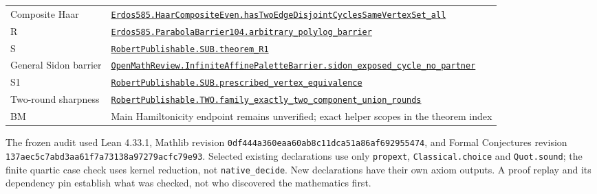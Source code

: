 \documentclass[smallextended]{svjour3}
\begin{document}
{\begin{longtable}[]{@{}
  >{\raggedright\arraybackslash}p{}
  >{\raggedright\arraybackslash}p{}@{}}
Composite Haar &
\href{https://github.com/alejandrozu/openmath-2026-judging/blob/70c5ec3107658182f22c207d4c50f53f9cb3e602/robert-review-2026-10-07/lean/Openmath/Proofs/HaarCompositeEven.lean\#L441}{\texttt{Erdos585.HaarCompositeEven.hasTwoEdgeDisjointCyclesSameVertexSet\_all}} \\
R &
\href{https://github.com/alejandrozu/openmath-2026-judging/blob/70c5ec3107658182f22c207d4c50f53f9cb3e602/robert-review-2026-10-07/lean/Openmath/Proofs/ParabolaBarrier104.lean\#L145}{\texttt{Erdos585.ParabolaBarrier104.arbitrary\_polylog\_barrier}} \\
S &
\href{https://github.com/alejandrozu/openmath-2026-judging/blob/70c5ec3107658182f22c207d4c50f53f9cb3e602/robert-review-2026-10-07/lean/R1.lean\#L13}{\texttt{RobertPublishable.SUB.theorem\_R1}} \\
General Sidon barrier &
\href{https://github.com/alejandrozu/openmath-2026-judging/blob/70c5ec3107658182f22c207d4c50f53f9cb3e602/robert-review-2026-10-07/lean/InfiniteAffinePaletteBarrier.lean\#L54}{\texttt{OpenMathReview.InfiniteAffinePaletteBarrier.sidon\_exposed\_cycle\_no\_partner}} \\
S1 &
\href{https://github.com/alejandrozu/openmath-2026-judging/blob/70c5ec3107658182f22c207d4c50f53f9cb3e602/robert-review-2026-10-07/lean/PrescribedVertex.lean\#L89}{\texttt{RobertPublishable.SUB.prescribed\_vertex\_equivalence}} \\
Two-round sharpness &
\href{https://github.com/alejandrozu/openmath-2026-judging/blob/70c5ec3107658182f22c207d4c50f53f9cb3e602/robert-review-2026-10-07/lean/CycleComposition.lean\#L171}{\texttt{RobertPublishable.TWO.family\_exactly\_two\_component\_union\_rounds}} \\
BM & Main Hamiltonicity endpoint remains unverified; exact helper scopes
in the theorem index \\
\end{longtable}
}

The frozen audit used Lean 4.33.1, Mathlib revision
\texttt{0df444a360eaa60ab8c11dca51a86af692955474}, and Formal
Conjectures revision \texttt{137aec5c7abd3aa61f7a73138a97279acfc79e93}.
Selected existing declarations use only \texttt{propext},
\texttt{Classical.choice} and \texttt{Quot.sound}; the finite quartic
case check uses kernel reduction, not \texttt{native\_decide}. New
declarations have their own axiom outputs. A proof replay and its
dependency pin establish what was checked, not who discovered the
mathematics first.
\end{document}
